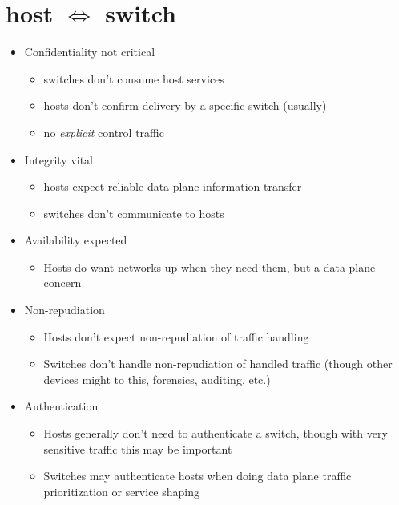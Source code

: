 \documentclass[12pt,letterpaper]{article}
\begin{document}
\section{host $\Longleftrightarrow$ switch}
\begin{itemize}
\item {\color{orange} Confidentiality not critical}
	\begin{itemize}
	\item switches don't consume host services
	\item hosts don't confirm delivery by a specific switch (usually)
	\item no {\sl explicit} control traffic
	\end{itemize}
\item {\color{red} Integrity vital}
	\begin{itemize}
	\item hosts expect reliable data plane information transfer
	\item switches don't communicate to hosts
	\end{itemize}
\item {\color{orange} Availability expected} 
	\begin{itemize}
	\item Hosts do want networks up when they need them, but a data plane concern
	\end{itemize}
\item {\color{green} Non-repudiation}
	\begin{itemize}
	\item Hosts don't expect non-repudiation of traffic handling
	\item Switches don't handle non-repudiation of handled traffic (though other devices might to this, forensics, auditing, etc.)
	\end{itemize}
\item {\color{green} Authentication}
	\begin{itemize}
	\item Hosts generally don't need to authenticate a switch, though with very sensitive traffic this may be important
	\item Switches may authenticate hosts when doing data plane traffic prioritization or service shaping
	\end{itemize}
\end{itemize}

\newpage
\end{document}
